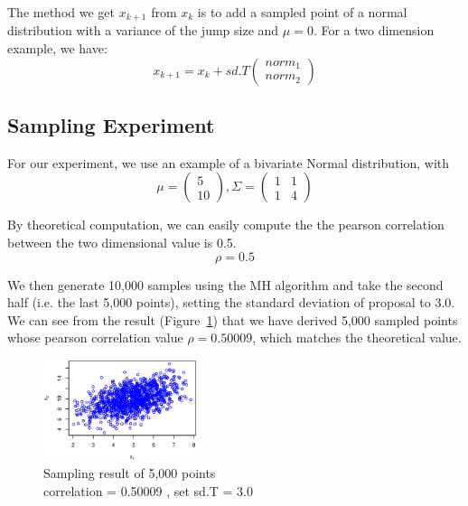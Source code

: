The method we get $x_{k+1}$ from $x_{k}$ is to add a sampled point of a normal distribution with a variance of the jump size and $\mu=0$. For a two dimension example, we have:
\begin{equation}
x_{k+1} = x_{k} + sd.T \left( \begin{array}{ccc}
norm_{1} \\
norm_{2} \end{array} \right) 
\end{equation}




\subsection{Sampling Experiment}
For our experiment, we use an example of a bivariate Normal distribution, with
$$ \mu = \left( \begin{array}{ccc}
5 \\
10 \end{array} \right), 
\Sigma = \left( \begin{array}{ccc}
1 & 1\\
1 & 4\end{array} \right)$$

By theoretical computation, we can easily compute the the pearson correlation between the two dimensional value is 0.5.
$$ \rho = 0.5 $$

We then generate 10,000 samples using the MH algorithm and take the second half (i.e. the last 5,000 points), setting the standard deviation of proposal to 3.0. We can see from the result (Figure~\ref{fig:sample_result}) that we have derived 5,000 sampled points whose pearson correlation value $\rho=0.50009$, which matches the theoretical value.

\begin{figure}[tb]
  	\centering
  	\includegraphics[width=0.4\textwidth]{figure/sample_result.eps}
	\caption{Sampling result of 5,000 points \protect\\ correlation = 0.50009 , set sd.T = 3.0}
	\label{fig:sample_result}
\end{figure}




